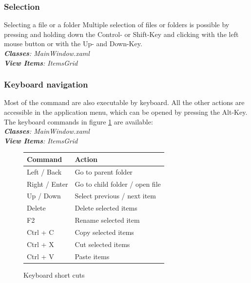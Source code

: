\documentclass[JCDReport.tex]{subfiles}
\begin{document}
\subsubsection{Selection}
Selecting a file or a folder 
Multiple selection of files or folders is possible by pressing and holding down the Control- or Shift-Key and clicking with the left mouse button or with the Up- and Down-Key.\\
\textit{\textbf{Classes}: MainWindow.xaml\\
\textbf{View Items}: ItemsGrid}

\subsubsection{Keyboard navigation}
Most of the command are also executable by keyboard. All the other actions are accessible in the application menu, which can be opened by pressing the Alt-Key.\\
The keyboard commands in figure \ref{table:keyboardShortCuts} are available:\\
\textit{\textbf{Classes}: MainWindow.xaml\\
\textbf{View Items}: ItemsGrid}

\begin{figure}[h!]
	\centering
	\begin{tabular}{| l | l |}
		\hline
		\textbf{Command} & \textbf{Action} \\ \hline \hline
		Left / Back & Go to parent folder \\ \hline
		Right / Enter & Go to child folder / open file \\ \hline
		Up / Down & Select previous / next item \\ \hline
		Delete & Delete selected items \\ \hline
		F2 & Rename selected item \\ \hline
		Ctrl + C & Copy selected items \\ \hline
		Ctrl + X & Cut selected items \\ \hline
		Ctrl + V & Paste items \\ \hline	
	\end{tabular}
	\caption{Keyboard short cuts}
	\label{table:keyboardShortCuts}
\end{figure}

\end{document}
